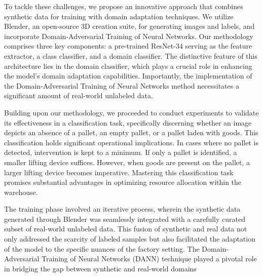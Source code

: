 \documentclass[sigconf,authordraft]{acmart}
\begin{document}
\noindent To tackle these challenges, we propose an innovative approach that combines synthetic data for training with domain adaptation techniques. We utilize Blender, an open-source 3D creation suite, for generating images and labels, and incorporate Domain-Adversarial Training of Neural Networks\cite{4}. Our methodology comprises three key components: a pre-trained ResNet-34\cite{6} serving as the feature extractor, a class classifier, and a domain classifier. The distinctive feature of this architecture lies in the domain classifier, which plays a crucial role in enhancing the model's domain adaptation capabilities. Importantly, the implementation of the Domain-Adversarial Training of Neural Networks method necessitates a significant amount of real-world unlabeled data.

\noindent Building upon our methodology, we proceeded to conduct experiments to validate its effectiveness in a classification task, specifically discerning whether an image depicts an absence of a pallet, an empty pallet, or a pallet laden with goods. This classification holds significant operational implications. In cases where no pallet is detected, intervention is kept to a minimum. If only a pallet is identified, a smaller lifting device suffices. However, when goods are present on the pallet, a larger lifting device becomes imperative. Mastering this classification task promises substantial advantages in optimizing resource allocation within the warehouse.

\noindent The training phase involved an iterative process, wherein the synthetic data generated through Blender was seamlessly integrated with a carefully curated subset of real-world unlabeled data. This fusion of synthetic and real data not only addressed the scarcity of labeled samples but also facilitated the adaptation of the model to the specific nuances of the factory setting. The Domain-Adversarial Training of Neural Networks (DANN) technique played a pivotal role in bridging the gap between synthetic and real-world domains
\end{document}
